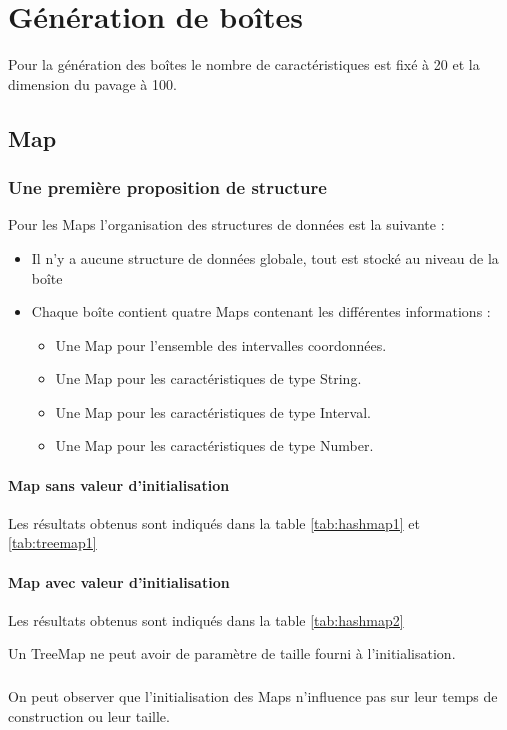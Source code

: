\chapter{Génération de boîtes}
Pour la génération des boîtes le nombre de caractéristiques est fixé à 20 et la dimension du pavage à 100.

\section{Map}

\subsection{Une première proposition de structure}
Pour les Maps l'organisation des structures de données est la suivante :
\begin{itemize}
\item Il n'y a aucune structure de données globale, tout est stocké au niveau de la boîte
 \item Chaque boîte contient quatre Maps contenant les différentes informations :
\begin{itemize}
 \item Une Map pour l'ensemble des intervalles coordonnées.
\item Une Map pour les caractéristiques de type String.
\item Une Map pour les caractéristiques de type Interval.
\item Une Map pour les caractéristiques de type Number.
\end{itemize}
\end{itemize}

\subsubsection{Map sans valeur d'initialisation}
Les résultats obtenus sont indiqués dans la table \ref{tab:hashmap1} et \ref{tab:treemap1}


\subsubsection{Map avec valeur d'initialisation}
Les résultats obtenus sont indiqués dans la table \ref{tab:hashmap2}


Un TreeMap ne peut avoir de paramètre de taille fourni à l'initialisation.

\paragraph{} On peut observer que l'initialisation des Maps n'influence pas sur leur temps de construction ou leur taille.

